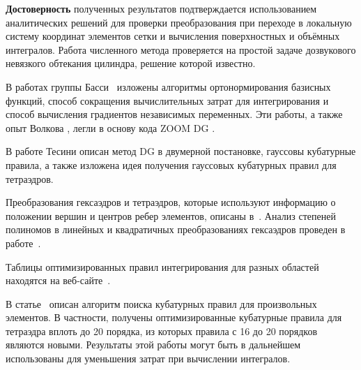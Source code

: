 \textbf{Достоверность} полученных результатов подтверждается использованием аналитических решений для проверки преобразования при переходе в локальную систему координат элементов сетки и вычисления поверхностных и объёмных интегралов. Работа численного метода проверяется на простой задаче дозвукового невязкого обтекания цилиндра, решение которой известно.




В работах группы Басси~\cite{Tesini:2008:en, Bassi:1997:en} изложены алгоритмы ортонормирования базисных функций, способ сокращения вычислительных затрат для интегрирования и способ вычисления градиентов независимых переменных. Эти работы, а также опыт Волкова \cite{VolkovA:2010:ru}, легли в основу кода ZOOM DG \cite{Podaruev:2017}.

В работе Тесини \cite{Tesini:2008:en} описан метод DG в двумерной постановке, гауссовы кубатурные правила, а также изложена идея получения гауссовых кубатурных правил для тетраэдров.

Преобразования гексаэдров и тетраэдров, которые используют информацию о положении вершин и центров ребер элементов, описаны в~\cite{Zienkiewicz:2000:en}. Анализ степеней полиномов в линейных и квадратичных преобразованиях гексаэдров проведен в работе~\cite{Efremova:2018}. 

Таблицы оптимизированных правил интегрирования для разных областей находятся на веб-сайте~\cite{CubatureRules}.

В статье~\cite{SukumarCubatureRules:2020:en} описан алгоритм поиска кубатурных правил для произвольных элементов. В частности, получены оптимизированные кубатурные правила для тетраэдра вплоть до 20 порядка, из которых правила с 16 до 20 порядков являются новыми. Результаты этой работы могут быть в дальнейшем использованы для уменьшения затрат при вычислении интегралов.